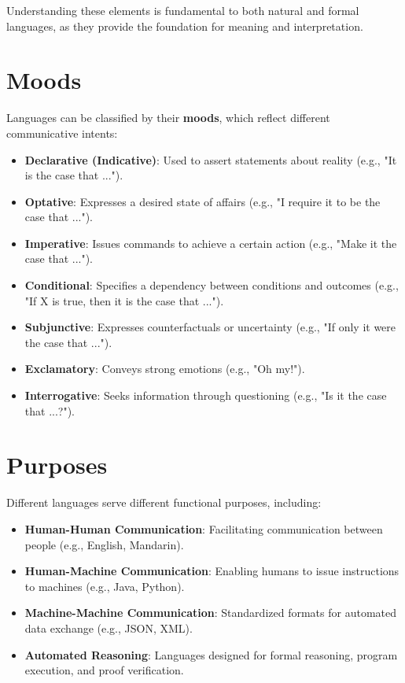 \documentclass{book}
\providecommand{\tightlist}{%
  \setlength{\itemsep}{0pt}\setlength{\parskip}{0pt}}
\begin{document}
Understanding these elements is fundamental to both natural and formal languages, as they provide the foundation for meaning and interpretation.

\hypertarget{book__pandoc__debug__src__languages.md__moods}{%
\section*{Moods}\label{book__pandoc__debug__src__languages.md__moods}}

Languages can be classified by their \textbf{moods}, which reflect different communicative intents:

\begin{itemize}
\tightlist
\item
  \textbf{Declarative (Indicative)}: Used to assert statements about reality (e.g., "It is the case that ...").
\item
  \textbf{Optative}: Expresses a desired state of affairs (e.g., "I require it to be the case that ...").
\item
  \textbf{Imperative}: Issues commands to achieve a certain action (e.g., "Make it the case that ...").
\item
  \textbf{Conditional}: Specifies a dependency between conditions and outcomes (e.g., "If X is true, then it is the case that ...").
\item
  \textbf{Subjunctive}: Expresses counterfactuals or uncertainty (e.g., "If only it were the case that ...").
\item
  \textbf{Exclamatory}: Conveys strong emotions (e.g., "Oh my!").
\item
  \textbf{Interrogative}: Seeks information through questioning (e.g., "Is it the case that ...?").
\end{itemize}

\hypertarget{book__pandoc__debug__src__languages.md__purposes}{%
\section*{Purposes}\label{book__pandoc__debug__src__languages.md__purposes}}

Different languages serve different functional purposes, including:

\begin{itemize}
\tightlist
\item
  \textbf{Human-Human Communication}: Facilitating communication between people (e.g., English, Mandarin).
\item
  \textbf{Human-Machine Communication}: Enabling humans to issue instructions to machines (e.g., Java, Python).
\item
  \textbf{Machine-Machine Communication}: Standardized formats for automated data exchange (e.g., JSON, XML).
\item
  \textbf{Automated Reasoning}: Languages designed for formal reasoning, program execution, and proof verification.
\end{itemize}
\end{document}
